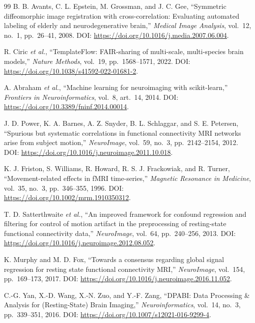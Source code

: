 \documentclass{ssnreview}
\begin{document}
\begin{thebibliography}{99}
 B. B. Avants, C. L. Epstein, M. Grossman, and J. C. Gee, ``Symmetric diffeomorphic image registration with cross-correlation: Evaluating automated labeling of elderly and neurodegenerative brain,'' \textit{Medical Image Analysis}, vol.~12, no.~1, pp.~26--41, 2008. DOI: \url{https://doi.org/10.1016/j.media.2007.06.004}.

 R. Ciric \textit{et al.}, ``TemplateFlow: FAIR-sharing of multi-scale, multi-species brain models,'' \textit{Nature Methods}, vol.~19, pp.~1568--1571, 2022. DOI: \url{https://doi.org/10.1038/s41592-022-01681-2}.

 A. Abraham \textit{et al.}, ``Machine learning for neuroimaging with scikit-learn,'' \textit{Frontiers in Neuroinformatics}, vol.~8, art.~14, 2014. DOI: \url{https://doi.org/10.3389/fninf.2014.00014}.

 J. D. Power, K. A. Barnes, A. Z. Snyder, B. L. Schlaggar, and S. E. Petersen, ``Spurious but systematic correlations in functional connectivity MRI networks arise from subject motion,'' \textit{NeuroImage}, vol.~59, no.~3, pp.~2142--2154, 2012. DOI: \url{https://doi.org/10.1016/j.neuroimage.2011.10.018}.

 K. J. Friston, S. Williams, R. Howard, R. S. J. Frackowiak, and R. Turner, ``Movement-related effects in fMRI time-series,'' \textit{Magnetic Resonance in Medicine}, vol.~35, no.~3, pp.~346--355, 1996. DOI: \url{https://doi.org/10.1002/mrm.1910350312}.

 T. D. Satterthwaite \textit{et al.}, ``An improved framework for confound regression and filtering for control of motion artifact in the preprocessing of resting-state functional connectivity data,'' \textit{NeuroImage}, vol.~64, pp.~240--256, 2013. DOI: \url{https://doi.org/10.1016/j.neuroimage.2012.08.052}.

 K. Murphy and M. D. Fox, ``Towards a consensus regarding global signal regression for resting state functional connectivity MRI,'' \textit{NeuroImage}, vol.~154, pp.~169--173, 2017. DOI: \url{https://doi.org/10.1016/j.neuroimage.2016.11.052}.

 C.-G. Yan, X.-D. Wang, X.-N. Zuo, and Y.-F. Zang, ``DPABI: Data Processing \& Analysis for (Resting-State) Brain Imaging,'' \textit{Neuroinformatics}, vol.~14, no.~3, pp.~339--351, 2016. DOI: \url{https://doi.org/10.1007/s12021-016-9299-4}.

\end{thebibliography}
\end{document}
